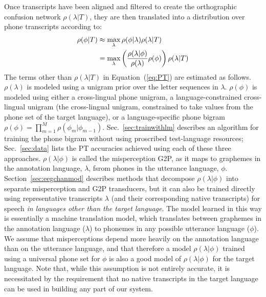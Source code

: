 Once transcripts have
been aligned and filtered to create the orthographic confusion network
$\rho(\lambda|T)$, they are then translated into a distribution over
phone transcripts according to:
\begin{align}
  \rho(\phi|T) 
  &\approx \max_{\lambda}  \rho(\phi|\lambda) \rho(\lambda|T) \notag \\
  &= \max_{\lambda}  \left(\frac{\rho(\lambda|\phi)}{\rho(\lambda)}
  \rho(\phi)\right) \rho(\lambda|T) 
\label{eq:PT}
\end{align}
The terms other than $\rho(\lambda|T)$ in Equation~(\ref{eq:PT}) are
estimated as follows.  $\rho(\lambda)$ is modeled using a unigram
prior over the letter sequences in $\lambda$.  $\rho(\phi)$ is modeled
using {\color{blue} either a cross-lingual phone unigram, a
  language-constrained cross-lingual unigram (the cross-lingual
  unigram, constrained to take values from the phone set of the target
  language), or a language-specific phone bigram
  $\rho(\phi)=\prod_{m=1}^M \rho(\phi_m|\phi_{m-1})$.
  Sec.~\ref{sec:trainwithlm} describes an algorithm for training the
  phone bigram without using proscribed test-language resources;
  Sec.~\ref{sec:data} lists the PT accuracies achieved using each of
  these three approaches.}
$\rho(\lambda|\phi)$ is called the misperception G2P, as it maps to
graphemes in the annotation language, $\lambda$, fsrom phones in the
utterance language, $\phi$.  Section~\ref{sec:eegchanmod} describes
methods that decompose $\rho(\lambda|\phi)$ into separate
misperception and G2P transducers, but it can also be trained directly
using
representative transcripts $\lambda$ (and their
corresponding native transcripts) for speech {\em in languages other
  than the target language}.
{\color{blue} The model learned in this way is essentially
  a machine translation model, which translates between graphemes in
  the annotation language ($\lambda$) to phonemes in any possible
  utterance language ($\phi$).}
We assume that misperceptions depend more
heavily on the annotation language than on the utterance language, and
that therefore a model $\rho(\lambda|\phi)$ trained using a universal
phone set for $\phi$ is also a good model of $\rho(\lambda|\phi)$ for
the target language. Note that, while this assumption is not entirely
accurate, it is necessitated by the requirement that no native
transcripts in the target language can be used in building any part
of our system.

